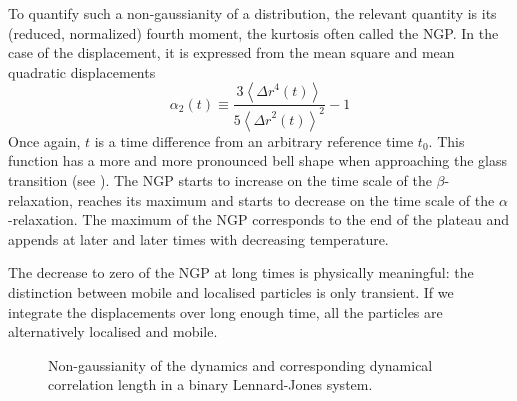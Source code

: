 To quantify such a non-gaussianity of a distribution, the relevant quantity is its (reduced, normalized) fourth moment, the kurtosis often called the \ac{NGP}. In the case of the displacement, it is expressed from the mean square and mean quadratic displacements
\begin{equation}
	\alpha_2(t) \equiv \frac{3 \left\langle {\Delta r}^4(t) \right\rangle}{5 {\left\langle {\Delta r}^2(t) \right\rangle}^2}-1
	\label{eq:ngp}
\end{equation}
Once again, $t$ is a time difference from an arbitrary reference time $t_0$. This function has a more and more pronounced bell shape when approaching the glass transition (see ). The \ac{NGP} starts to increase on the time scale of the $\beta$-relaxation, reaches its maximum and starts to decrease on the time scale of the $\alpha$-relaxation. The maximum of the \ac{NGP} corresponds to the end of the plateau and appends at later and later times with decreasing temperature.

The decrease to zero of the \ac{NGP} at long times is physically meaningful: the distinction between mobile and localised particles is only transient. If we integrate the displacements over long enough time, all the particles are alternatively localised and mobile.

\begin{figure}
	\centering
	\caption{Non-gaussianity of the dynamics and corresponding dynamical correlation length in a binary Lennard-Jones system.}
\end{figure}


